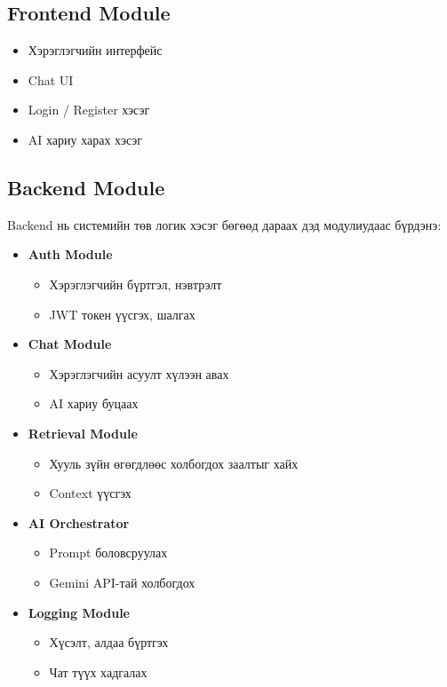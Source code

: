 \subsection{Frontend Module}

\begin{itemize}
    \item Хэрэглэгчийн интерфейс
    \item Chat UI
    \item Login / Register хэсэг
    \item AI хариу харах хэсэг
\end{itemize}

\subsection{Backend Module}

Backend нь системийн төв логик хэсэг бөгөөд дараах дэд модулиудаас бүрдэнэ:

\begin{itemize}

    \item \textbf{Auth Module}
    \begin{itemize}
        \item Хэрэглэгчийн бүртгэл, нэвтрэлт
        \item JWT токен үүсгэх, шалгах
    \end{itemize}

    \item \textbf{Chat Module}
    \begin{itemize}
        \item Хэрэглэгчийн асуулт хүлээн авах
        \item AI хариу буцаах
    \end{itemize}

    \item \textbf{Retrieval Module}
    \begin{itemize}
        \item Хууль зүйн өгөгдлөөс холбогдох заалтыг хайх
        \item Context үүсгэх
    \end{itemize}

    \item \textbf{AI Orchestrator}
    \begin{itemize}
        \item Prompt боловсруулах
        \item Gemini API-тай холбогдох
    \end{itemize}

    \item \textbf{Logging Module}
    \begin{itemize}
        \item Хүсэлт, алдаа бүртгэх
        \item Чат түүх хадгалах
    \end{itemize}

\end{itemize}

